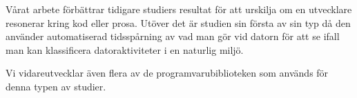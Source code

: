 \documentclass{popsci}
\begin{document}



Vårat arbete förbättrar tidigare studiers resultat för att urskilja om en utvecklare resonerar kring kod eller prosa. Utöver det är studien sin första av sin typ då den använder automatiserad tidsspårning av vad man gör vid datorn för att se ifall man kan klassificera datoraktiviteter i en naturlig miljö.

Vi vidareutvecklar även flera av de programvarubiblioteken som används för denna typen av studier.

\end{document}
